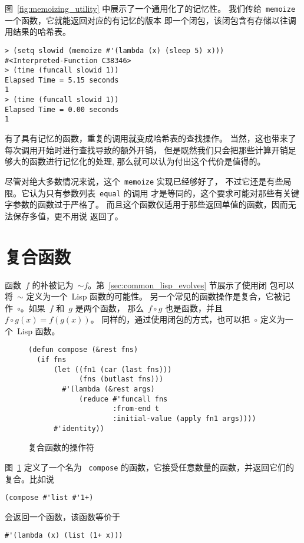 图~\ref{fig:memoizing_utility} 中展示了一个通用化了的记忆性\utility{}。
我们传给~\verb|memoize| 一个函数，它就能返回对应的有记忆的版本\pozhehao{}
即一个闭包，该闭包含有存储以往调用结果的哈希表。

\begin{lstlisting}
> (setq slowid (memoize #'(lambda (x) (sleep 5) x)))
#<Interpreted-Function C38346>
> (time (funcall slowid 1))
Elapsed Time = 5.15 seconds
1
> (time (funcall slowid 1))
Elapsed Time = 0.00 seconds
1
\end{lstlisting}
有了具有记忆的函数，重复的调用就变成哈希表的查找操作。
当然，这也带来了每次调用开始时进行查找导致的额外开销，
但是既然我们只会把那些计算开销足够大的函数进行记忆化的处理,
那么就可以认为付出这个代价是值得的。

尽管对绝大多数情况来说，这个~\verb|memoize| 实现已经够好了，
不过它还是有些局限。它认为只有参数列表~\verb|equal| 的调用
才是等同的，这个要求可能对那些有关键字参数的函数过于严格了。
而且这个函数仅适用于那些返回单值的函数，因而无法保存多值，更不用说
返回了。

\section{复合函数}
\label{sec:composing_functions}

函数~$f$ 的补被记为~$\sim f$。第~\ref{sec:common_lisp_evolves} 节展示了使用闭
包可以将~$\sim$ 定义为一个~Lisp 函数的可能性。
另一个常见的函数操作是复合，它被记作~$\circ$。如果~$f$ 和~$g$ 是两个函数，
那么~$f \circ g$ 也是函数，并且~$f \circ g(x) = f(g(x))$。
同样的，通过使用闭包的方式，也可以把~$\circ$ 定义为一个~Lisp 函数。

\begin{figure}
\begin{lstlisting}
(defun compose (&rest fns)
  (if fns
      (let ((fn1 (car (last fns)))
            (fns (butlast fns)))
        #'(lambda (&rest args)
            (reduce #'funcall fns
                    :from-end t
                    :initial-value (apply fn1 args))))
      #'identity))
\end{lstlisting}
\caption{\label{fig:an_operator_for_functional_composition}复合函数的操作符}
\end{figure}
 
图~\ref{fig:an_operator_for_functional_composition} 定义了一个名为
~\texttt{compose} 的函数，它接受任意数量的函数，并返回它们的复合。比如说
\begin{lstlisting}
(compose #'list #'1+)
\end{lstlisting}
会返回一个函数，该函数等价于
\begin{lstlisting}
#'(lambda (x) (list (1+ x)))
\end{lstlisting}


